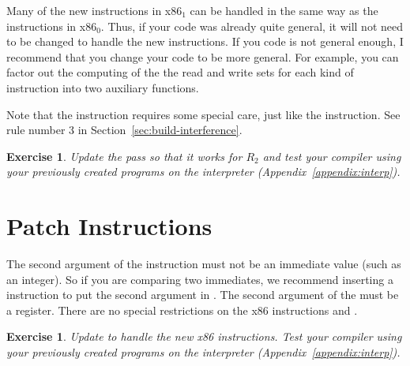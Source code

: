 \documentclass[11pt]{book}
\newtheorem{exercise}[theorem]{Exercise}
\begin{document}
Many of the new instructions in x86$_1$ can be handled in the same way
as the instructions in x86$_0$. Thus, if your code was already quite
general, it will not need to be changed to handle the new
instructions. If you code is not general enough, I recommend that you
change your code to be more general. For example, you can factor out
the computing of the the read and write sets for each kind of
instruction into two auxiliary functions.

Note that the  instruction requires some special care,
just like the  instruction. See rule number 3 in
Section~\ref{sec:build-interference}.



\begin{exercise}\normalfont
Update the  pass so that it works for $R_2$
and test your compiler using your previously created programs on the
 interpreter (Appendix~\ref{appendix:interp}).
\end{exercise}


\section{Patch Instructions}

The second argument of the  instruction must not be an
immediate value (such as an integer). So if you are comparing two
immediates, we recommend inserting a  instruction to put the
second argument in .
%
The second argument of the  must be a register.
%
There are no special restrictions on the x86 instructions 
and .

\begin{exercise}\normalfont
Update  to handle the new x86 instructions.
Test your compiler using your previously created programs on the
 interpreter (Appendix~\ref{appendix:interp}).
\end{exercise}
\end{document}
